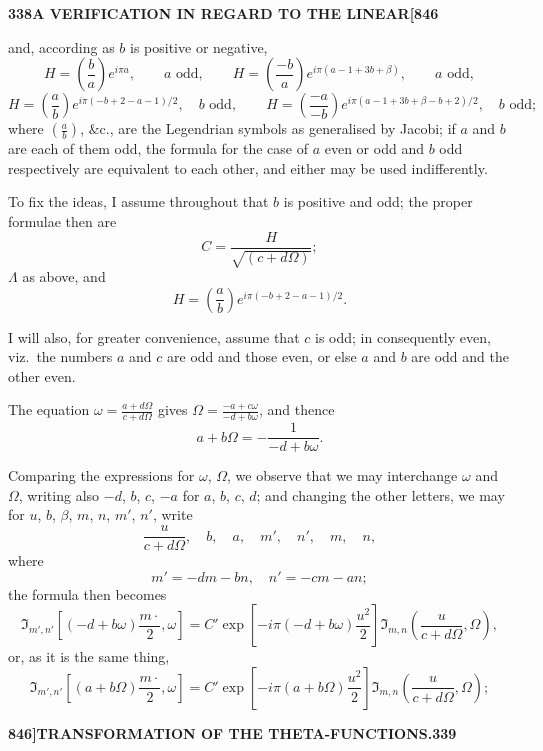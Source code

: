 \documentclass[11pt,a4paper]{book}
\begin{document}
\noindent\textbf{338}\hfill\textbf{A VERIFICATION IN REGARD TO THE LINEAR}\hfill\textbf{[846}

\bigskip

\noindent and, according as $b$ is positive or negative,
\[
H = \left(\frac{b}{a}\right) e^{i\pi a}, \qquad a \text{ odd}, \qquad H = \left(\frac{-b}{a}\right) e^{i\pi(a-1+3b+\beta)}, \qquad a \text{ odd},
\]
\[
H = \left(\frac{a}{b}\right) e^{i\pi(-b+2-a-1)/2}, \quad b \text{ odd}, \quad\quad H = \left(\frac{-a}{-b}\right) e^{i\pi(a-1+3b+\beta-b+2)/2}, \quad b \text{ odd};
\]
where $\left(\frac{a}{b}\right)$, $\&\text{c.}$, are the Legendrian symbols as generalised by Jacobi; if $a$ and $b$ are each of them odd, the formula for the case of $a$ even or odd and $b$ odd respectively are equivalent to each other, and either may be used indifferently.

To fix the ideas, I assume throughout that $b$ is positive and odd; the proper formulae then are
\[
C = \frac{H}{\sqrt{(c + d\Omega)}};
\]
$\Lambda$ as above, and
\[
H = \left(\frac{a}{b}\right) e^{i\pi(-b+2-a-1)/2}.
\]

I will also, for greater convenience, assume that $c$ is odd; in consequently even, viz.\ the numbers $a$ and $c$ are odd and those even, or else $a$ and $b$ are odd and the other even.

The equation $\omega = \frac{a + d\Omega}{c + d\Omega}$ gives $\Omega = \frac{-a + c\omega}{-d + b\omega}$, and thence
\[
a + b\Omega = -\frac{1}{-d + b\omega}.
\]

Comparing the expressions for $\omega$, $\Omega$, we observe that we may interchange $\omega$ and $\Omega$, writing also $-d$, $b$, $c$, $-a$ for $a$, $b$, $c$, $d$; and changing the other letters, we may for $u$, $b$, $\beta$, $m$, $n$, $m'$, $n'$,
write
\[
\frac{u}{c + d\Omega}, \quad b, \quad a, \quad m', \quad n', \quad m, \quad n,
\]
where
\[
m' = -dm - bn, \quad n' = -cm - an;
\]
the formula then becomes
\[
\Im_{m',n'}\left[(-d + b\omega)\frac{m\cdot}{2}, \omega\right] = C' \exp\left[-i\pi(-d + b\omega)\frac{u^2}{2}\right] \Im_{m,n}\left(\frac{u}{c + d\Omega}, \Omega\right),
\]
or, as it is the same thing,
\[
\Im_{m',n'}\left[(a + b\Omega)\frac{m\cdot}{2}, \omega\right] = C' \exp\left[-i\pi(a + b\Omega)\frac{u^2}{2}\right] \Im_{m,n}\left(\frac{u}{c + d\Omega}, \Omega\right);
\]

\newpage
\setcounter{page}{339}

\noindent\textbf{846]}\hfill\textbf{TRANSFORMATION OF THE THETA-FUNCTIONS.}\hfill\textbf{339}
\end{document}
